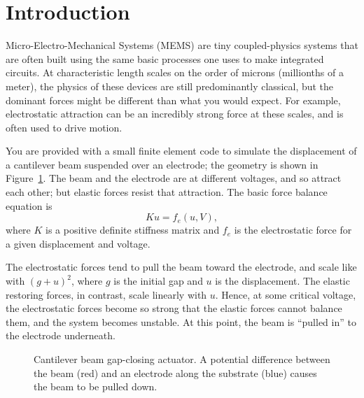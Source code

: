 \documentclass[12pt, leqno]{article} %
\begin{document}

\section{Introduction}

Micro-Electro-Mechanical Systems (MEMS) are tiny coupled-physics
systems that are often built using the same basic processes one uses
to make integrated circuits.  At characteristic length scales on the
order of microns (millionths of a meter), the physics of these devices
are still predominantly classical, but the dominant forces might be
different than what you would expect.  For example, electrostatic
attraction can be an incredibly strong force at these scales, and is
often used to drive motion.

You are provided with a small finite element code to simulate the
displacement of a cantilever beam suspended over an electrode; the
geometry is shown in Figure~\ref{fig:beam}.  The beam and the
electrode are at different voltages, and so attract each other;
but elastic forces resist that attraction.  The basic force balance
equation is
\[
  Ku = f_e(u, V),
\]
where $K$ is a positive definite stiffness matrix and $f_e$ is the
electrostatic force for a given displacement and voltage.

The electrostatic forces tend to pull the beam toward the electrode,
and scale like with $(g+u)^2$, where $g$ is the initial gap and $u$ is
the displacement.  The elastic restoring forces, in contrast, scale
linearly with $u$.  Hence, at some critical voltage, the electrostatic
forces become so strong that the elastic forces cannot balance them,
and the system becomes unstable.  At this point, the beam is ``pulled
in'' to the electrode underneath.

\begin{figure}
  \begin{center}
  \end{center}
  \caption{Cantilever beam gap-closing actuator.  A potential
    difference between the beam (red) and an electrode along
    the substrate (blue) causes the beam to be pulled down.}
  \label{fig:beam}
\end{figure}
\end{document}
